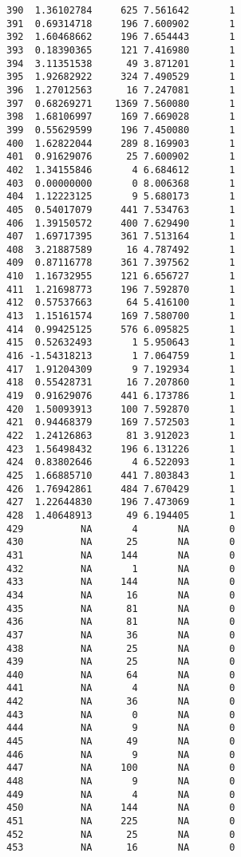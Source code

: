 \documentclass[
  letterpaper,
  DIV=11,
  numbers=noendperiod]{scrreprt}
\begin{document}
\begin{verbatim}
390  1.36102784     625 7.561642       1
391  0.69314718     196 7.600902       1
392  1.60468662     196 7.654443       1
393  0.18390365     121 7.416980       1
394  3.11351538      49 3.871201       1
395  1.92682922     324 7.490529       1
396  1.27012563      16 7.247081       1
397  0.68269271    1369 7.560080       1
398  1.68106997     169 7.669028       1
399  0.55629599     196 7.450080       1
400  1.62822044     289 8.169903       1
401  0.91629076      25 7.600902       1
402  1.34155846       4 6.684612       1
403  0.00000000       0 8.006368       1
404  1.12223125       9 5.680173       1
405  0.54017079     441 7.534763       1
406  1.39150572     400 7.629490       1
407  1.69717395     361 7.513164       1
408  3.21887589      16 4.787492       1
409  0.87116778     361 7.397562       1
410  1.16732955     121 6.656727       1
411  1.21698773     196 7.592870       1
412  0.57537663      64 5.416100       1
413  1.15161574     169 7.580700       1
414  0.99425125     576 6.095825       1
415  0.52632493       1 5.950643       1
416 -1.54318213       1 7.064759       1
417  1.91204309       9 7.192934       1
418  0.55428731      16 7.207860       1
419  0.91629076     441 6.173786       1
420  1.50093913     100 7.592870       1
421  0.94468379     169 7.572503       1
422  1.24126863      81 3.912023       1
423  1.56498432     196 6.131226       1
424  0.83802646       4 6.522093       1
425  1.66885710     441 7.803843       1
426  1.76942861     484 7.670429       1
427  1.22644830     196 7.473069       1
428  1.40648913      49 6.194405       1
429          NA       4       NA       0
430          NA      25       NA       0
431          NA     144       NA       0
432          NA       1       NA       0
433          NA     144       NA       0
434          NA      16       NA       0
435          NA      81       NA       0
436          NA      81       NA       0
437          NA      36       NA       0
438          NA      25       NA       0
439          NA      25       NA       0
440          NA      64       NA       0
441          NA       4       NA       0
442          NA      36       NA       0
443          NA       0       NA       0
444          NA       9       NA       0
445          NA      49       NA       0
446          NA       9       NA       0
447          NA     100       NA       0
448          NA       9       NA       0
449          NA       4       NA       0
450          NA     144       NA       0
451          NA     225       NA       0
452          NA      25       NA       0
453          NA      16       NA       0

\end{verbatim}
\end{document}
